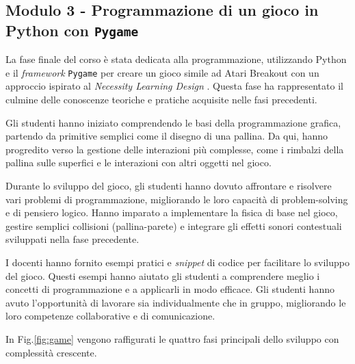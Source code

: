 \documentclass{easychair}
\begin{document}
\subsection{Modulo 3 - Programmazione di un gioco in Python con \texttt{Pygame}}

La fase finale del corso è stata dedicata alla programmazione, utilizzando Python e il \textit{framework} \texttt{Pygame} per creare un gioco simile ad Atari Breakout con un approccio ispirato al \textit{Necessity Learning Design} \cite{Sbaraglia}. Questa fase ha rappresentato il culmine delle conoscenze teoriche e pratiche acquisite nelle fasi precedenti.

Gli studenti hanno iniziato comprendendo le basi della programmazione grafica, partendo da primitive semplici come il disegno di una pallina. Da qui, hanno progredito verso la gestione delle interazioni più complesse, come i rimbalzi della pallina sulle superfici e le interazioni con altri oggetti nel gioco.

Durante lo sviluppo del gioco, gli studenti hanno dovuto affrontare e risolvere vari problemi di programmazione, migliorando le loro capacità di problem-solving e di pensiero logico. Hanno imparato a implementare la fisica di base nel gioco, gestire semplici collisioni (pallina-parete) e integrare gli effetti sonori contestuali sviluppati nella fase precedente.

I docenti hanno fornito esempi pratici e \textit{snippet} di codice per facilitare lo sviluppo del gioco. Questi esempi hanno aiutato gli studenti a comprendere meglio i concetti di programmazione e a applicarli in modo efficace. Gli studenti hanno avuto l'opportunità di lavorare sia individualmente che in gruppo, migliorando le loro competenze collaborative e di comunicazione.

In Fig.\ref{fig:game} vengono raffigurati le quattro fasi principali dello sviluppo con complessità crescente.
\end{document}
